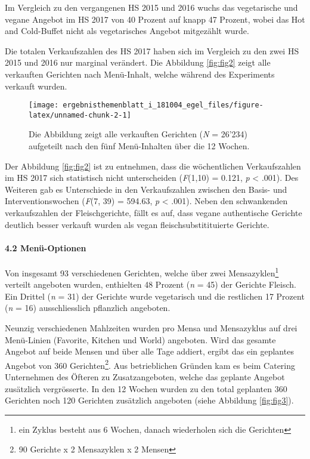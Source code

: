 \documentclass[12pt,ngerman,]{article}
\let\oldparagraph\paragraph
\renewcommand{\paragraph}[1]{\oldparagraph{#1}\mbox{}}
\let\rmarkdownfootnote\footnote%
\def\footnote{\protect\rmarkdownfootnote}
\begin{document}
Im Vergleich zu den vergangenen HS 2015 und 2016 wuchs das vegetarische
und vegane Angebot im HS 2017 von 40 Prozent auf knapp 47 Prozent, wobei
das Hot and Cold-Buffet nicht als vegetarisches Angebot mitgezählt
wurde.

\par

Die totalen Verkaufszahlen des HS 2017 haben sich im Vergleich zu den
zwei HS 2015 und 2016 nur marginal verändert. Die Abbildung
\ref{fig:fig2} zeigt alle verkauften Gerichten nach Menü-Inhalt, welche
während des Experiments verkauft wurden.

\begin{figure}[H]

{\centering \texttt{[image: ergebnisthemenblatt\_i\_181004\_egel\_files/figure-latex/unnamed-chunk-2-1]} 

}

\caption{\label{fig:fig2} Die Abbildung zeigt alle verkauften Gerichten (\textit{N} = 26'234) aufgeteilt nach den fünf Menü-Inhalten über die 12 Wochen.}\label{fig:unnamed-chunk-2}
\end{figure}

Der Abbildung \ref{fig:fig2} ist zu entnehmen, dass die wöchentlichen
Verkaufszahlen im HS 2017 sich statistisch nicht unterscheiden
(\emph{F}(1,10) = 0.121, \emph{p} \textless{} .001). Des Weiteren gab es
Unterschiede in den Verkaufszahlen zwischen den Basis- und
Interventionswochen (\emph{F}(7, 39) = 594.63, \emph{p} \textless{}
.001). Neben den schwankenden verkaufszahlen der Fleischgerichte, fällt
es auf, dass vegane authentische Gerichte deutlich besser verkauft
wurden als vegan fleischsubstitituierte Gerichte.

\hypertarget{menu-optionen}{%
\paragraph{4.2 Menü-Optionen}\label{menu-optionen}}

Von insgesamt 93 verschiedenen Gerichten, welche über zwei
Mensazyklen\footnote{ein Zyklus besteht aus 6 Wochen, danach wiederholen
  sich die Gerichten} verteilt angeboten wurden, enthielten 48 Prozent
(\emph{n} = 45) der Gerichte Fleisch. Ein Drittel (\emph{n} = 31) der
Gerichte wurde vegetarisch und die restlichen 17 Prozent (\emph{n} = 16)
ausschliesslich pflanzlich angeboten.

\par

Neunzig verschiedenen Mahlzeiten wurden pro Mensa und Mensazyklus auf
drei Menü-Linien (Favorite, Kitchen und World) angeboten. Wird das
gesamte Angebot auf beide Mensen und über alle Tage addiert, ergibt das
ein geplantes Angebot von 360 Gerichten\footnote{90 Gerichte x 2
  Mensazyklen x 2 Mensen}. Aus betrieblichen Gründen kam es beim
Catering Unternehmen des Öfteren zu Zusatzangeboten, welche das geplante
Angebot zusätzlich vergrösserte. In den 12 Wochen wurden zu den total
geplanten 360 Gerichten noch 120 Gerichten zusätzlich angeboten (siehe
Abbildung \ref{fig:fig3}).
\end{document}
